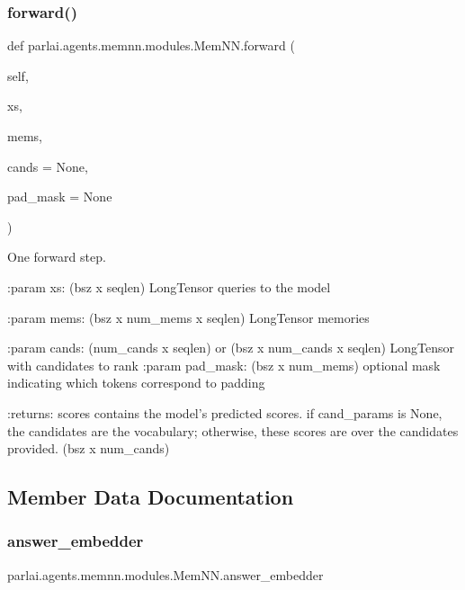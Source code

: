 \subsubsection{\texorpdfstring{forward()}{forward()}}
{\footnotesize\ttfamily def parlai.\+agents.\+memnn.\+modules.\+Mem\+N\+N.\+forward (\begin{DoxyParamCaption}\item[{}]{self,  }\item[{}]{xs,  }\item[{}]{mems,  }\item[{}]{cands = {\ttfamily None},  }\item[{}]{pad\+\_\+mask = {\ttfamily None} }\end{DoxyParamCaption})}

\begin{DoxyVerb}One forward step.

:param xs:
    (bsz x seqlen) LongTensor queries to the model

:param mems:
    (bsz x num_mems x seqlen) LongTensor memories

:param cands:
    (num_cands x seqlen) or (bsz x num_cands x seqlen)
    LongTensor with candidates to rank
:param pad_mask:
    (bsz x num_mems) optional mask indicating which tokens
    correspond to padding

:returns:
    scores contains the model's predicted scores.
    if cand_params is None, the candidates are the vocabulary;
    otherwise, these scores are over the candidates provided.
    (bsz x num_cands)
\end{DoxyVerb}
 

\subsection{Member Data Documentation}
\mbox{\label{classparlai_1_1agents_1_1memnn_1_1modules_1_1MemNN_ac1282441a297691b0c9287db71f381ff}} 
\subsubsection{\texorpdfstring{answer\+\_\+embedder}{answer\_embedder}}
{\footnotesize\ttfamily parlai.\+agents.\+memnn.\+modules.\+Mem\+N\+N.\+answer\+\_\+embedder}

